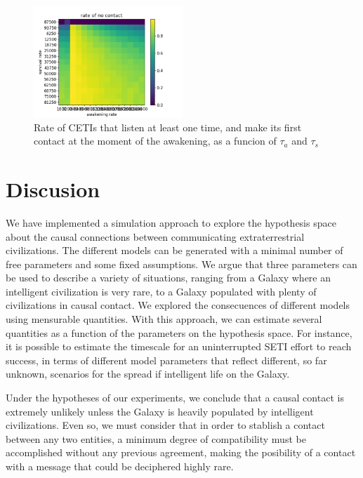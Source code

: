 \documentclass[crop]{CSLB}%
\begin{document}
 \begin{figure} %
   \centering
   \includegraphics[width=0.5\textwidth]{Figure_5.png}
   \caption{Rate of CETIs that listen at least one time, and make its
   first contact at the moment of the awakening, as a funcion of
   $\tau_a$ and $\tau_s$}
   \label{F_res_3}
\end{figure}
 
 
 

 

\section{Discusion}\label{S_discussion}

We have implemented a simulation approach to explore the hypothesis
space about the causal connections between communicating
extraterrestrial civilizations.
%
The different models can be generated with a minimal number of free
parameters and some fixed assumptions.
%
We argue that three parameters can be used to describe a variety of
situations, ranging from a Galaxy where an intelligent civilization is
very rare, to a Galaxy populated with plenty of civilizations in
causal contact.
%
We explored the consecuences of different models using mensurable
quantities.
%
With this approach, we can estimate several quantities as a function
of the parameters on the hypothesis space.
%
For instance, it is possible to estimate the timescale for an
uninterrupted SETI effort to reach success, in terms of different
model parameters that reflect different, so far unknown, scenarios
for the spread if intelligent life on the Galaxy.


Under the hypotheses of our experiments, we conclude that
a causal contact is extremely unlikely unless the Galaxy is heavily
populated by intelligent civilizations.
%
Even so, we must consider that in order to stablish a contact between
any two entities, a minimum degree of compatibility must be
accomplished without any previous agreement, 
making the posibility of a contact with a message that
could be deciphered highly rare.
\end{document}
